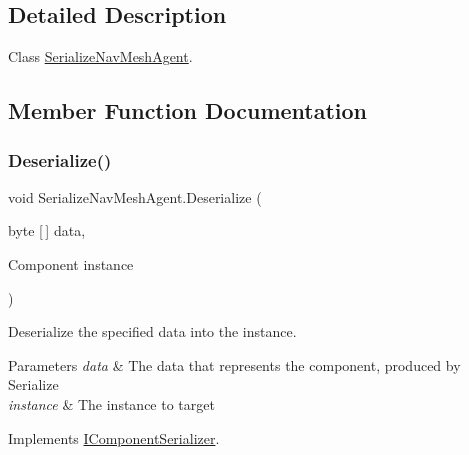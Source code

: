\subsection{Detailed Description}
Class \hyperlink{class_serialize_nav_mesh_agent}{Serialize\+Nav\+Mesh\+Agent}. 



\subsection{Member Function Documentation}
\mbox{\label{class_serialize_nav_mesh_agent_ad5a28c80e751f4727a1a4b83c06b5428}} 
\subsubsection{\texorpdfstring{Deserialize()}{Deserialize()}}
{\footnotesize\ttfamily void Serialize\+Nav\+Mesh\+Agent.\+Deserialize (\begin{DoxyParamCaption}\item[{byte \mbox{[}$\,$\mbox{]}}]{data,  }\item[{Component}]{instance }\end{DoxyParamCaption})\hspace{0.3cm}{\ttfamily [inline]}}



Deserialize the specified data into the instance. 


\begin{DoxyParams}{Parameters}
{\em data} & The data that represents the component, produced by Serialize\\
\hline
{\em instance} & The instance to target\\
\hline
\end{DoxyParams}


Implements \hyperlink{interface_i_component_serializer_a4cc366a5c78b33d47a90c209d8fed883}{I\+Component\+Serializer}.

\mbox{\label{class_serialize_nav_mesh_agent_a74cea446ba02a0814a3c215c27fa81d8}} 
